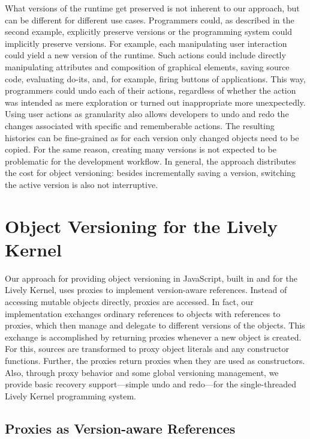 What versions of the runtime get preserved is not inherent to our approach, but can be different for different use cases.
Programmers could, as described in the second example, explicitly preserve versions or the programming system could implicitly preserve versions.
For example, each manipulating user interaction could yield a new version of the runtime.
Such actions could include directly manipulating attributes and composition of graphical elements, saving source code, evaluating do-its, and, for example, firing buttons of applications.
This way, programmers could undo each of their actions, regardless of whether the action was intended as mere exploration or turned out inappropriate more unexpectedly.
Using user actions as granularity also allows developers to undo and redo the changes associated with specific and rememberable actions.
The resulting histories can be fine-grained as for each version only changed objects need to be copied.
For the same reason, creating many versions is not expected to be problematic for the development workflow.
In general, the approach distributes the cost for object versioning: besides incrementally saving a version, switching the active version is also not interruptive.



\section{Object Versioning for the Lively Kernel} \label{sec:APPROACH:2}

Our approach for providing object versioning in JavaScript, built in and for the Lively Kernel, uses proxies to implement version-aware references.
Instead of accessing mutable objects directly, proxies are accessed.
In fact, our implementation exchanges ordinary references to objects with references to proxies, which then manage and delegate to different versions of the objects.
This exchange is accomplished by returning proxies whenever a new object is created.
For this, sources are transformed to proxy object literals and any constructor functions.
Further, the proxies return proxies when they are used as constructors.
Also, through proxy behavior and some global versioning management, we provide basic recovery support---simple undo and redo---for the single-threaded Lively Kernel programming system.


\subsection{Proxies as Version-aware References}

